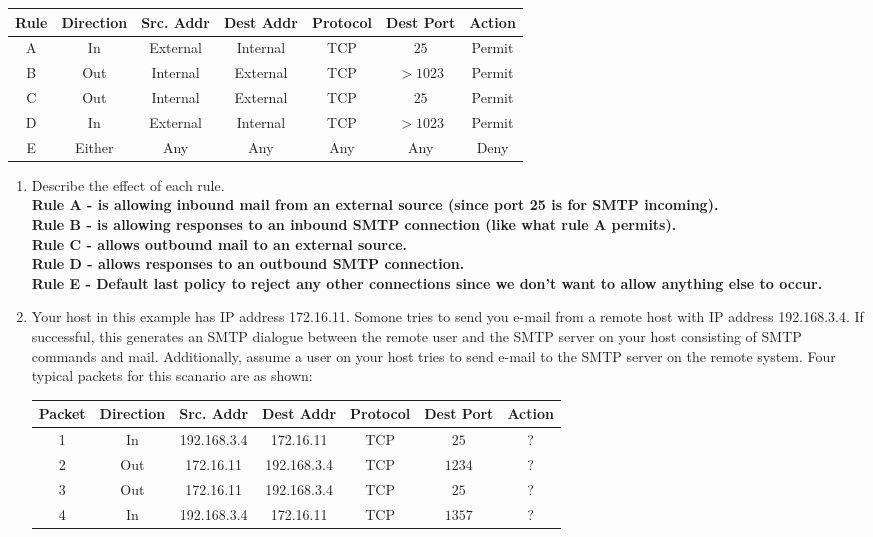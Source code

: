 \documentclass[12pt]{article}
\begin{document}
\begin{enumerate}
\begin{center}
 \begin{tabular}{||c c c c c c c||}
 \hline
 Rule & Direction & Src. Addr & Dest Addr  & Protocol & Dest Port & Action \\ [0.5ex]
 \hline\hline
 A & In & External & Internal & TCP & $25$ & Permit \\
 \hline
 B & Out & Internal & External & TCP & $>1023$ & Permit \\
 \hline
 C & Out & Internal & External & TCP & $25$ & Permit \\
 \hline
 D & In & External & Internal & TCP & $>1023$ & Permit \\
 \hline
 E & Either & Any & Any & Any & Any & Deny \\ [1ex]
 \hline
\end{tabular}
\end{center}

\begin{enumerate}
  \item Describe the effect of each rule. \\
  \textbf{Rule A - is allowing inbound mail from an external source (since port 25 is for SMTP incoming).} \\
  \textbf{Rule B - is allowing responses to an inbound SMTP connection (like what rule A permits).} \\
  \textbf{Rule C - allows outbound mail to an external source.} \\
  \textbf{Rule D - allows responses to an outbound SMTP connection.} \\
  \textbf{Rule E - Default last policy to reject any other connections since we don't want to allow anything else to occur.} \\

  \item Your host in this example has IP address 172.16.11. Somone tries to send you e-mail from a remote host with IP address 192.168.3.4. If successful, this generates an SMTP dialogue between the remote user and the SMTP server on your host consisting of SMTP commands and mail. Additionally, assume a user on your host tries to send e-mail to the SMTP server on the remote system. Four typical packets for this scanario are as shown:

  \begin{center}
   \begin{tabular}{||c c c c c c c||}
   \hline
   Packet & Direction & Src. Addr & Dest Addr  & Protocol & Dest Port & Action \\ [0.5ex]
   \hline\hline
   1 & In & 192.168.3.4 & 172.16.11 & TCP & $25$ & ? \\
   \hline
   2 & Out & 172.16.11 & 192.168.3.4 & TCP & $1234$ & ? \\
   \hline
   3 & Out & 172.16.11 & 192.168.3.4 & TCP & $25$ & ? \\
   \hline
   4 & In & 192.168.3.4 & 172.16.11 & TCP & $1357$ & ? \\ [1ex]
   \hline
  \end{tabular}
  \end{center}


\end{enumerate}
\end{enumerate}
\end{document}
